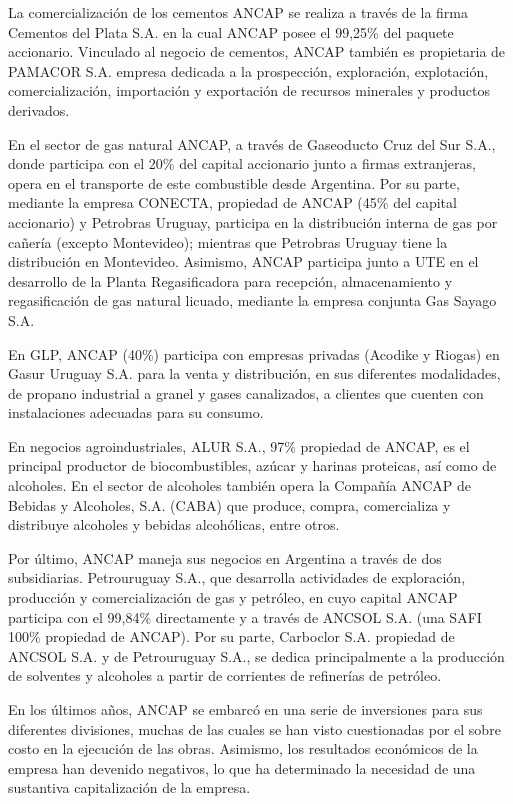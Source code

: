 \documentclass[
  12pt,
  spanish,
]{book}
\begin{document}
La comercialización de los cementos ANCAP se realiza a través de la firma Cementos del Plata S.A. en la cual ANCAP posee el 99,25\% del paquete accionario. Vinculado al negocio de cementos, ANCAP también es propietaria de PAMACOR S.A. empresa dedicada a la prospección, exploración, explotación, comercialización, importación y exportación de recursos minerales y productos derivados.

En el sector de gas natural ANCAP, a través de Gaseoducto Cruz del Sur S.A., donde participa con el 20\% del capital accionario junto a firmas extranjeras, opera en el transporte de este combustible desde Argentina. Por su parte, mediante la empresa CONECTA, propiedad de ANCAP (45\% del capital accionario) y Petrobras Uruguay, participa en la distribución interna de gas por cañería (excepto Montevideo); mientras que Petrobras Uruguay tiene la distribución en Montevideo. Asimismo, ANCAP participa junto a UTE en el desarrollo de la Planta Regasificadora para recepción, almacenamiento y regasificación de gas natural licuado, mediante la empresa conjunta Gas Sayago S.A.

En GLP, ANCAP (40\%) participa con empresas privadas (Acodike y Riogas) en Gasur Uruguay S.A. para la venta y distribución, en sus diferentes modalidades, de propano industrial a granel y gases canalizados, a clientes que cuenten con instalaciones adecuadas para su consumo.

En negocios agroindustriales, ALUR S.A., 97\% propiedad de ANCAP, es el principal productor de biocombustibles, azúcar y harinas proteicas, así como de alcoholes. En el sector de alcoholes también opera la Compañía ANCAP de Bebidas y Alcoholes, S.A. (CABA) que produce, compra, comercializa y distribuye alcoholes y bebidas alcohólicas, entre otros.

Por último, ANCAP maneja sus negocios en Argentina a través de dos subsidiarias. Petrouruguay S.A., que desarrolla actividades de exploración, producción y comercialización de gas y petróleo, en cuyo capital ANCAP participa con el 99,84\% directamente y a través de ANCSOL S.A. (una SAFI 100\% propiedad de ANCAP). Por su parte, Carboclor S.A. propiedad de ANCSOL S.A. y de Petrouruguay S.A., se dedica principalmente a la producción de solventes y alcoholes a partir de corrientes de refinerías de petróleo.

En los últimos años, ANCAP se embarcó en una serie de inversiones para sus diferentes divisiones, muchas de las cuales se han visto cuestionadas por el sobre costo en la ejecución de las obras. Asimismo, los resultados económicos de la empresa han devenido negativos, lo que ha determinado la necesidad de una sustantiva capitalización de la empresa.
\end{document}
